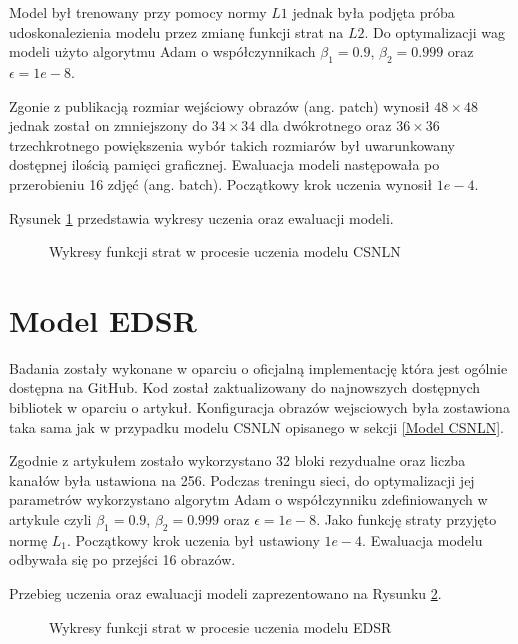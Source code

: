 \documentclass[a4paper,12pt,twoside,openany]{report}
\newcommand{\ImgPath}{.}
\begin{document}
Model był trenowany przy pomocy normy $L1$ jednak była podjęta próba udoskonalezienia modelu przez zmianę funkcji strat na $L2$. Do  optymalizacji wag  modeli użyto algorytmu Adam o  współczynnikach $\beta_1=0.9$, $\beta_2=0.999$ oraz $\epsilon=1e-8$. 

Zgonie z publikacją rozmiar  wejściowy obrazów (ang. patch) wynosił $48 \times 48$ jednak został on zmniejszony do $34 \times 34$ dla dwókrotnego oraz $36 \times 36$ trzechkrotnego powiększenia wybór takich rozmiarów był uwarunkowany dostępnej ilością pamięci graficznej. Ewaluacja modeli następowała po przerobieniu 16 zdjęć (ang. batch). Początkowy krok uczenia wynosił $1e-4$. 

Rysunek \ref{CSNLN_uczenie} przedstawia wykresy uczenia oraz ewaluacji modeli. 
\begin{figure}[!htbp]
	
	\begin{center}
		\centering
	\end{center}
	\caption{Wykresy funkcji strat w procesie uczenia modelu CSNLN}
	\label{CSNLN_uczenie}
\end{figure}


\section{Model EDSR}
\label{Model_EDSR}
Badania zostały wykonane w oparciu o oficjalną implementację która jest ogólnie dostępna na GitHub. Kod został zaktualizowany do najnowszych  dostępnych bibliotek w oparciu o artykuł. Konfiguracja obrazów wejsciowych była zostawiona taka sama jak w przypadku modelu CSNLN opisanego w sekcji \ref{Model CSNLN}. 

Zgodnie z artykułem zostało wykorzystano 32 bloki rezydualne  oraz liczba kanałów była ustawiona na 256. Podczas treningu sieci, do optymalizacji jej parametrów wykorzystano algorytm Adam o współczynniku zdefiniowanych  w artykule czyli $\beta_1=0.9$, $\beta_2=0.999$ oraz $\epsilon=1e-8$. Jako funkcję straty przyjęto normę $L_1$. Początkowy krok uczenia był ustawiony $1e-4$.  Ewaluacja modelu odbywała się po przejści 16 obrazów.

Przebieg uczenia oraz ewaluacji modeli zaprezentowano na Rysunku \ref{EDSR_uczenie}.
\begin{figure}[!htbp]	
	\begin{center}
		\centering
	\end{center}
	\caption{Wykresy funkcji strat w procesie uczenia modelu EDSR}
	\label{EDSR_uczenie}
\end{figure}
\end{document}
